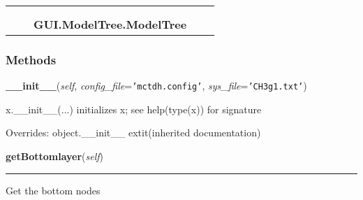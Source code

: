     \label{GUI:ModelTree:ModelTree}
\begin{tabular}{cccccc}
\multicolumn{2}{r}{\settowidth{\BCL}{object}\multirow{2}{\BCL}{object}}
&&
  \\\cline{3-3}
  &&\multicolumn{1}{c|}{}
&&
  \\
&&\multicolumn{2}{l}{\textbf{GUI.ModelTree.ModelTree}}
\end{tabular}



  \subsubsection{Methods}

    \vspace{0.5ex}

\hspace{.8\funcindent}\begin{boxedminipage}{\funcwidth}

    \raggedright \textbf{\_\_init\_\_}(\textit{self}, \textit{config\_file}={\tt \texttt{'}\texttt{mctdh.config}\texttt{'}}, \textit{sys\_file}={\tt \texttt{'}\texttt{CH3g1.txt}\texttt{'}})

\setlength{\parskip}{2ex}
    x.\_\_init\_\_(...) initializes x; see help(type(x)) for signature

\setlength{\parskip}{1ex}
      Overrides: object.\_\_init\_\_ 	extit{(inherited documentation)}

    \end{boxedminipage}

    \label{GUI:ModelTree:ModelTree:getBottomlayer}

    \vspace{0.5ex}

\hspace{.8\funcindent}\begin{boxedminipage}{\funcwidth}

    \raggedright \textbf{getBottomlayer}(\textit{self})

    \vspace{-1.5ex}

    \rule{\textwidth}{0.5\fboxrule}
\setlength{\parskip}{2ex}
    Get the bottom nodes

\setlength{\parskip}{1ex}
    \end{boxedminipage}

